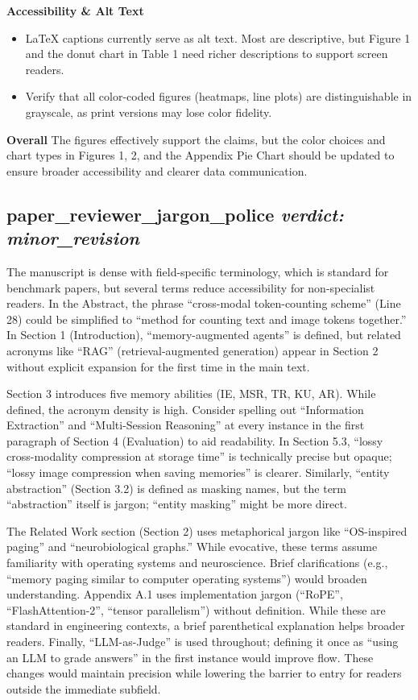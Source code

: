 \documentclass{llmxive}
\begin{document}
\textbf{Accessibility \& Alt Text}
\begin{itemize}\setlength\itemsep{2pt}
\item LaTeX captions currently serve as alt text. Most are descriptive, but Figure 1 and the donut chart in Table 1 need richer descriptions to support screen readers.
\item Verify that all color-coded figures (heatmaps, line plots) are distinguishable in grayscale, as print versions may lose color fidelity.
\end{itemize}

\textbf{Overall}
The figures effectively support the claims, but the color choices and chart types in Figures 1, 2, and the Appendix Pie Chart should be updated to ensure broader accessibility and clearer data communication.

\bigskip

\subsection*{paper\_reviewer\_jargon\_police \hfill \textit{verdict: minor\_revision}}
The manuscript is dense with field-specific terminology, which is standard for benchmark papers, but several terms reduce accessibility for non-specialist readers. In the Abstract, the phrase ``cross-modal token-counting scheme'' (Line 28) could be simplified to ``method for counting text and image tokens together.'' In Section 1 (Introduction), ``memory-augmented agents'' is defined, but related acronyms like ``RAG'' (retrieval-augmented generation) appear in Section 2 without explicit expansion for the first time in the main text.

Section 3 introduces five memory abilities (IE, MSR, TR, KU, AR). While defined, the acronym density is high. Consider spelling out ``Information Extraction'' and ``Multi-Session Reasoning'' at every instance in the first paragraph of Section 4 (Evaluation) to aid readability. In Section 5.3, ``lossy cross-modality compression at storage time'' is technically precise but opaque; ``lossy image compression when saving memories'' is clearer. Similarly, ``entity abstraction'' (Section 3.2) is defined as masking names, but the term ``abstraction'' itself is jargon; ``entity masking'' might be more direct.

The Related Work section (Section 2) uses metaphorical jargon like ``OS-inspired paging'' and ``neurobiological graphs.'' While evocative, these terms assume familiarity with operating systems and neuroscience. Brief clarifications (e.g., ``memory paging similar to computer operating systems'') would broaden understanding. Appendix A.1 uses implementation jargon (``RoPE'', ``FlashAttention-2'', ``tensor parallelism'') without definition. While these are standard in engineering contexts, a brief parenthetical explanation helps broader readers. Finally, ``LLM-as-Judge'' is used throughout; defining it once as ``using an LLM to grade answers'' in the first instance would improve flow. These changes would maintain precision while lowering the barrier to entry for readers outside the immediate subfield.
\end{document}
